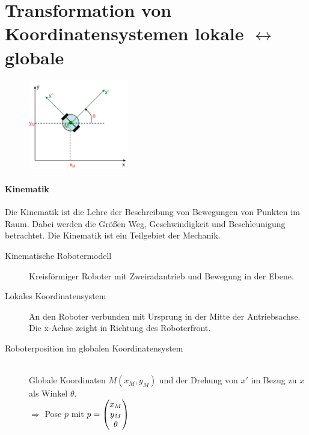 \section{
	Transformation von Koordinatensystemen lokale $\leftrightarrow$ globale
}

{
\begin{figure}
	\centering
	\includegraphics[width=0.39\textwidth]
		{Resources/PNG/transformationLocalGlobalBsp.png}
	\caption{}
\end{figure}

\paragraph{Kinematik} Die Kinematik ist die Lehre der Beschreibung von
Bewegungen von Punkten im Raum. Dabei werden die Größen Weg, Geschwindigkeit
und Beschleunigung betrachtet. Die Kinematik ist ein Teilgebiet der Mechanik.

\begin{description}
	\item[Kinematische Robotermodell] Kreisförmiger Roboter mit Zweiradantrieb
		und Bewegung in der Ebene.
	\item[Lokales Koordinatensystem] An den Roboter verbunden mit Ursprung in der
		Mitte der Antriebsachse. Die x-Achse zeight in Richtung des Roboterfront.
	\item[Roboterposition im globalen Koordinatensystem] \hfill \\
		Globale Koordinaten $M(x_M, y_M)$ und der Drehung von $x'$ im Bezug zu $x$
		als Winkel $\theta$. \\
		$\Rightarrow$ Pose $p$ mit $p = \begin{pmatrix}x_M\\y_M\\\theta\end{pmatrix}$

\end{description}

}

